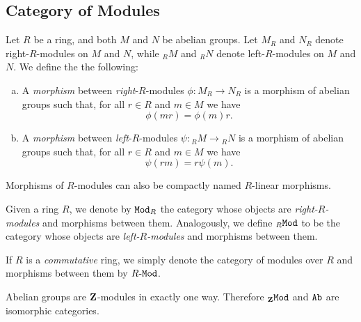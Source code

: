 \subsection{Category of Modules}

\begin{definition}
    \label{def:morphisms-of-modules}
    Let \(R\) be a ring, and both \(M\) and \(N\) be abelian groups. Let \(M_R\) and
    \(N_R\) denote right-\(R\)-modules on \(M\) and \(N\), while \({}_RM\) and
    \({}_RN\) denote left-\(R\)-modules on \(M\) and \(N\). We define the the
    following:
    \begin{enumerate}[(a)]\setlength\itemsep{0em}
        \item A \emph{morphism} between \emph{right}-\(R\)-modules \(\phi: M_R \to N_R\)
              is a morphism of abelian groups such that, for all \(r \in R\) and \(m \in M\)
              we have
              \[
                  \phi(m r) = \phi(m) r.
              \]
        \item A \emph{morphism} between \emph{left}-\(R\)-modules
              \(\psi: {}_RM \to {}_RN\) is a morphism of abelian groups such that, for all
              \(r \in R\) and \(m \in M\) we have
              \[
                  \psi(r m) = r \psi(m).
              \]
    \end{enumerate}
    Morphisms of \(R\)-modules can also be compactly named \(R\)-linear morphisms.
\end{definition}

\begin{definition}
    \label{def:category-of-R-Mod}
    Given a ring \(R\), we denote by \({\texttt{Mod}_{R}}\) the category whose objects are
    \emph{right-\(R\)-modules} and morphisms between them. Analogously, we define
    \({{}_{R}\texttt{Mod}}\) to be the category whose objects are \emph{left-\(R\)-modules} and
    morphisms between them.

    If \(R\) is a \emph{commutative} ring, we simply denote the category of modules
    over \(R\) and morphisms between them by \({R\text{-}\texttt{Mod}}\).
\end{definition}

\begin{proposition}[\(\Z\)-modules]
    \label{prop:abelian-groups-are-Z-modules}
    Abelian groups are \(\Z\)-modules in exactly one way. Therefore \({{}_{\mathbf{Z}}\texttt{Mod}}\)
    and \({\texttt{Ab}}\) are isomorphic categories.
\end{proposition}


